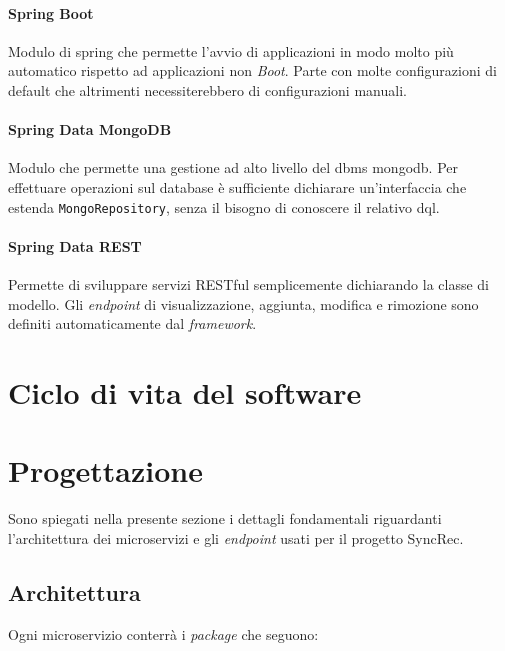 \paragraph*{Spring Boot} Modulo di \gls{spring} che permette l'avvio di applicazioni in modo molto più automatico rispetto ad applicazioni non \textit{Boot}. Parte con molte configurazioni di default che altrimenti necessiterebbero di configurazioni manuali.

\paragraph*{Spring Data MongoDB} Modulo che permette una gestione ad alto livello del \acrshort{dbms} \gls{mongodb}.
Per effettuare operazioni sul database è sufficiente dichiarare un'interfaccia che estenda \texttt{MongoRepository}, senza il bisogno di conoscere il relativo \gls{dql}.

\paragraph*{Spring Data REST} Permette di sviluppare servizi RESTful semplicemente dichiarando la classe di modello.
Gli \textit{endpoint} di visualizzazione, aggiunta, modifica e rimozione sono definiti automaticamente dal \textit{framework}.

\section{Ciclo di vita del software}
\label{sec:ciclo-vita-software}

\section{Progettazione}\label{sec:progettazione}

Sono spiegati nella presente sezione i dettagli fondamentali riguardanti l'architettura dei microservizi e gli \textit{endpoint} usati per il progetto SyncRec.

\subsection{Architettura}
Ogni \gls{microservizio} conterrà i \textit{package} che seguono:

